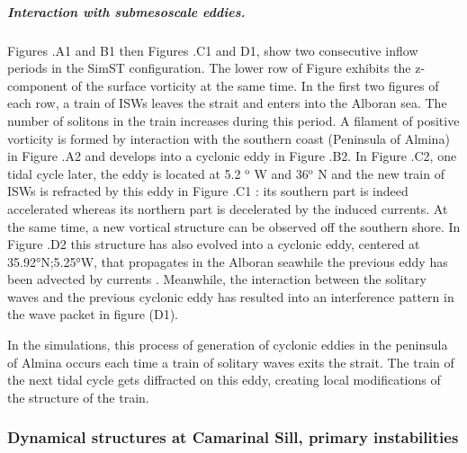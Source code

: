 \subparagraph{Interaction with submesoscale eddies.}
Figures .A1 and B1 then Figures .C1 and D1, show two consecutive inflow periods in the SimST configuration. The lower row of Figure  exhibits the z-component of the surface vorticity at the same time. In the first two figures of each row, a train of ISWs leaves the strait and enters into the Alboran sea. The number of solitons in the train increases during this period. A filament of positive vorticity is formed by interaction with the southern coast (Peninsula of Almina) in Figure .A2 and develops into a cyclonic eddy in Figure .B2. In Figure .C2, one tidal cycle later, the eddy is located at 5.2 $^\text{o}$ W and 36$^\text{o}$ N and the new train of ISWs is refracted by this eddy in Figure .C1 : its southern part is indeed accelerated whereas its northern part is decelerated by the induced currents. At the same time, a new vortical structure can be observed off the southern shore. In Figure .D2 this structure has also evolved into a cyclonic eddy, centered at 35.92°N;5.25°W, that propagates in the Alboran sea\color{red}while the previous eddy has been advected by currents \color{black}. Meanwhile, the interaction between the solitary waves and the previous cyclonic eddy has resulted into an interference pattern in the wave packet in figure (D1). 

In the simulations, this process of generation of cyclonic eddies in the peninsula of Almina occurs each time a train of solitary waves exits the strait. The train of the next tidal cycle gets diffracted on this eddy, creating local modifications of the structure of the train.

\subsubsection{Dynamical structures at Camarinal Sill, primary instabilities}
\label{sectionsim3D_res_insta}

